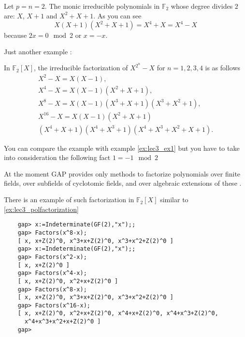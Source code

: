 \begin{example}
  Let $p = n = 2$. The monic irreducible polynomials in $\mathbb{F}_2$
  whose degree divides $2$ are: $X$, $X+1$ and $X^2 +X + 1$.
  As you can see
  \begin{equation}
    X\left(X+1\right)\left(X^2+X+1\right) = X^4 + X = X^4 - X
    \nonumber
  \end{equation}
  because $2x = 0 \mod 2$ or $x = -x$.
  \label{ex:lec3_ex1}
\end{example}

Just another example \cite{bib:KeithConradFiniteFields}:
\begin{myexample}
  \label{ex:lec3_polfactorization}
  In $\mathbb{F}_2\left[X\right]$, the irreducible factorization of
  $X^{2^n} -X$ for $n=1,2,3,4$ is as follows
  \begin{eqnarray}
    X^2 -X = X \left(X-1\right),
    \nonumber \\
    X^4 -X = X \left(X-1\right)\left(X^2 + X + 1\right),
    \nonumber \\
    X^8 -X = X \left(X-1\right)\left(X^3 + X + 1\right)
    \left(X^3 + X^2 + 1\right),
    \nonumber \\
    X^{16} -X = X \left(X-1\right)\left(X^2 + X + 1\right)
    \nonumber \\
    \left(X^4 + X + 1\right)\left(X^4 + X^3 + 1\right)
    \left(X^4 + X^3 + X^2 + X + 1\right).
    \nonumber
  \end{eqnarray}

  You can compare the example with example \ref{ex:lec3_ex1} but you
  have to take into consideration the following fact
  $1 = -1 \mod 2$
\end{myexample}

\begin{gapexample}
  At the moment GAP provides only methods to factorize polynomials
  over finite fields, over subfields of cyclotomic
  fields, and over algebraic extensions of these \cite{bib:gap}.
  
  There is an example of such factorization in
  $\mathbb{F}_2\left[X\right]$ similar to \autoref{ex:lec3_polfactorization}
  \begin{verbatim}  
    gap> x:=Indeterminate(GF(2),"x");;
    gap> Factors(x^8-x);
    [ x, x+Z(2)^0, x^3+x+Z(2)^0, x^3+x^2+Z(2)^0 ]
    gap> x:=Indeterminate(GF(2),"x");;
    gap> Factors(x^2-x);
    [ x, x+Z(2)^0 ]
    gap> Factors(x^4-x);
    [ x, x+Z(2)^0, x^2+x+Z(2)^0 ]
    gap> Factors(x^8-x);
    [ x, x+Z(2)^0, x^3+x+Z(2)^0, x^3+x^2+Z(2)^0 ]
    gap> Factors(x^16-x);
    [ x, x+Z(2)^0, x^2+x+Z(2)^0, x^4+x+Z(2)^0, x^4+x^3+Z(2)^0, 
      x^4+x^3+x^2+x+Z(2)^0 ]
    gap>
  \end{verbatim}
\end{gapexample}



